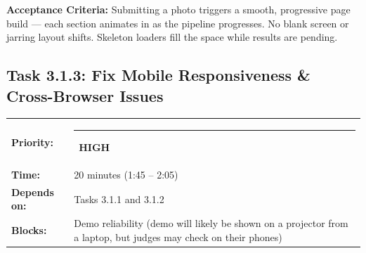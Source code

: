\documentclass[11pt, a4paper]{article}
\newcommand{\highpri}{\textcolor{highamber}{\rule{6pt}{6pt}}~\textcolor{highamber}{\scriptsize\textbf{HIGH}}}
\begin{document}
\textbf{Acceptance Criteria:} Submitting a photo triggers a smooth, progressive page build --- each section animates in as the pipeline progresses. No blank screen or jarring layout shifts. Skeleton loaders fill the space while results are pending.

\vspace{1em}

\subsection{Task 3.1.3: Fix Mobile Responsiveness \& Cross-Browser Issues}

\begin{tabularx}{\textwidth}{lX}
\textbf{Priority:} & \highpri \\
\textbf{Time:} & 20 minutes (1:45 -- 2:05) \\
\textbf{Depends on:} & Tasks 3.1.1 and 3.1.2 \\
\textbf{Blocks:} & Demo reliability (demo will likely be shown on a projector from a laptop, but judges may check on their phones) \\
\end{tabularx}

\vspace{0.3em}
\end{document}

